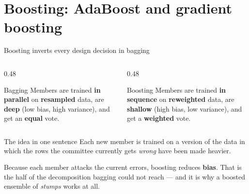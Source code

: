 \documentclass[aspectratio=169]{beamer}
\begin{document}
\section[Boosting]{Boosting: AdaBoost and gradient boosting}
\label{sec:boost}

\begin{frame}[shrink=3]{Boosting inverts every design decision in bagging}
  \begin{columns}[T]
    \begin{column}{0.48\textwidth}
      \begin{block}{Bagging}
        Members are trained \textbf{in parallel} on \textbf{resampled} data,
        are \textbf{deep} (low bias, high variance), and get an
        \textbf{equal} vote.
      \end{block}
    \end{column}
    \begin{column}{0.48\textwidth}
      \begin{alertblock}{Boosting}
        Members are trained \textbf{in sequence} on \textbf{reweighted} data,
        are \textbf{shallow} (high bias, low variance), and get a
        \textbf{weighted} vote.
      \end{alertblock}
    \end{column}
  \end{columns}
  \vspace{0.4em}
  \begin{exampleblock}{The idea in one sentence}
    \centering
    Each new member is trained on a version of the data in which the rows the
    committee currently gets \emph{wrong} have been made heavier.
  \end{exampleblock}
  \begin{center}\small
    Because each member attacks the current errors, boosting reduces
    \textbf{bias}. That is the half of the decomposition bagging could not
    reach --- and it is why a boosted ensemble of \emph{stumps} works at all.
  \end{center}
\end{frame}
\end{document}
